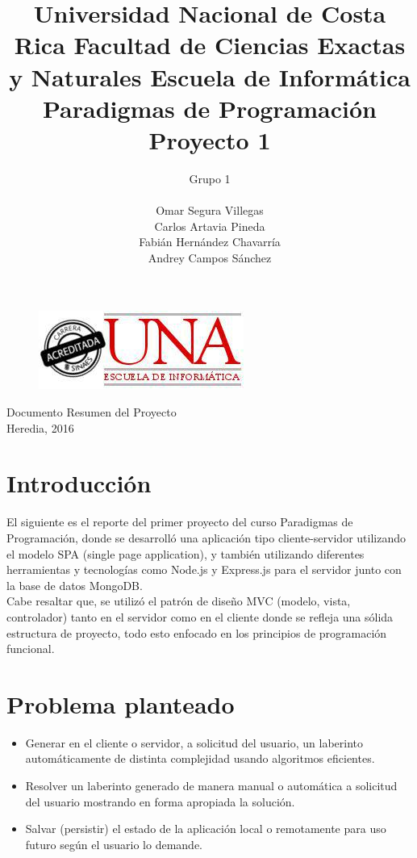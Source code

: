 \documentclass[11pt]{article}
\title{\textbf{Universidad Nacional de Costa Rica \newline \newline Facultad de Ciencias Exactas y Naturales \newline \newline Escuela de Informática \newline \newline Paradigmas de Programación \newline \newline Proyecto 1}}
\author{\newline Grupo 1 \\\\ Omar Segura Villegas \\ Carlos Artavia Pineda \\ Fabián Hernández Chavarría \\ Andrey Campos Sánchez}
\date{}
\begin{document}
\maketitle

\begin{figure}[h] 
\includegraphics[scale=0.5]{logouna}
\centering
\end{figure}
\begin{flushright}
Documento Resumen del Proyecto \\ Heredia, 2016
\end{flushright}

\newpage

\tableofcontents

\newpage

\section{Introducción}
El siguiente es el reporte del primer proyecto del curso Paradigmas de Programación, donde se desarrolló una aplicación tipo cliente-servidor utilizando el modelo SPA (single page application), y también utilizando diferentes herramientas y tecnologías como Node.js y Express.js para el servidor junto con la base de datos MongoDB.\\
	Cabe resaltar que, se utilizó el patrón de diseño MVC (modelo, vista, controlador) tanto en el servidor como en el cliente donde se refleja una sólida estructura de proyecto, todo esto enfocado en los principios de programación funcional.\\

\newpage

\section{Problema planteado}
\begin{itemize}
	\item Generar en el cliente o servidor, a solicitud del usuario, un laberinto automáticamente de distinta complejidad usando algoritmos eficientes.
	\item Resolver un laberinto generado de manera manual o automática a solicitud del usuario mostrando en forma apropiada la solución.
	\item Salvar (persistir) el estado de la aplicación local o remotamente para uso futuro según el usuario lo demande.
\end{itemize}
	
\end{document}
